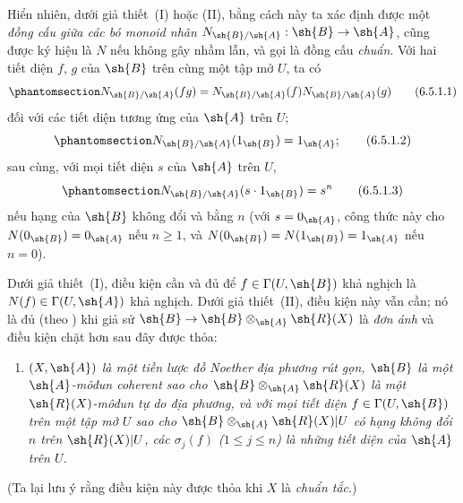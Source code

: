 \documentclass[oneside,10pt]{amsart}
\makeatletter
\renewcommand{\leq}{\leqslant}
\renewcommand{\geq}{\geqslant}
\newcommand{\ega@arrow}[2]{\mathchoice{#1}{#2}{#2}{#2}}
\renewcommand{\to}{\ega@arrow{\longrightarrow}{\rightarrow}}
\let\EGAOriginalLabel\label
\renewcommand{\label}[1]{\phantomsection\EGAOriginalLabel{#1}}
\makeatother
\begin{document}
\begin{env}[6.5.1]
Hiển nhiên, dưới giả thiết~(I) hoặc (II), bằng cách này ta xác định được một \emph{đồng cấu giữa các bó monoid nhân} $N_{\sh{B}/\sh{A}}:\sh{B}\to\sh{A}$, cũng được ký hiệu là $N$ nếu không gây nhầm lẫn, và gọi là đồng cấu \emph{chuẩn}.
Với hai tiết diện $f$, $g$ của $\sh{B}$ trên cùng một tập mở $U$, ta có
\[
\label{II.6.5.1.1}
  N_{\sh{B}/\sh{A}}(fg) = N_{\sh{B}/\sh{A}}(f)N_{\sh{B}/\sh{A}}(g)
\tag{6.5.1.1}
\]
đối với các tiết diện tương ứng của $\sh{A}$ trên $U$;
\[
\label{II.6.5.1.2}
  N_{\sh{B}/\sh{A}}(1_{\sh{B}}) = 1_{\sh{A}};
\tag{6.5.1.2}
\]
sau cùng, với mọi tiết diện $s$ của $\sh{A}$ trên $U$,
\[
\label{II.6.5.1.3}
  N_{\sh{B}/\sh{A}}(s\cdot1_{\sh{B}}) = s^n
\tag{6.5.1.3}
\]
nếu hạng của $\sh{B}$ không đổi và bằng $n$ (với $s=0_{\sh{A}}$, công thức này cho $N(0_{\sh{B}})=0_{\sh{A}}$ nếu $n\geq1$, và $N(0_{\sh{B}})=N(1_{\sh{B}})=1_{\sh{A}}$ nếu $n=0$).

Dưới giả thiết~(I), điều kiện cần và đủ để $f\in\Gamma(U,\sh{B})$ khả nghịch là $N(f)\in\Gamma(U,\sh{A})$ khả nghịch.
Dưới giả thiết~(II), điều kiện này vẫn cần;
nó là đủ (theo ) khi giả sử $\sh{B}\to\sh{B}\otimes_{\sh{A}}\sh{R}(X)$ là \emph{đơn ánh} và điều kiện chặt hơn sau đây được thỏa:
\begin{enumerate}
  \item[{\rm(II~\emph{bis})}] \emph{$(X,\sh{A})$ là một tiền lược đồ Noether địa phương rút gọn, $\sh{B}$ là một $\sh{A}$-môđun coherent sao cho $\sh{B}\otimes_{\sh{A}}\sh{R}(X)$ là một $\sh{R}(X)$-môđun tự do địa phương, và với mọi tiết diện $f\in\Gamma(U,\sh{B})$ trên một tập mở $U$ sao cho $\sh{B}\otimes_{\sh{A}}\sh{R}(X)|U$ có hạng không đổi~$n$ trên $\sh{R}(X)|U$, các $\sigma_j(f)$ ($1\leq j\leq n$) là những tiết diện của $\sh{A}$ trên $U$.}
\end{enumerate}

(Ta lại lưu ý rằng điều kiện này được thỏa khi $X$ là \emph{chuẩn tắc}.)
\end{env}
\end{document}
